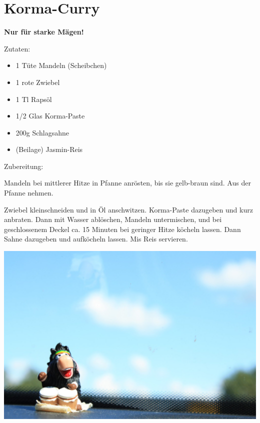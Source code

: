 \section{Korma-Curry}
\textbf{Nur für starke Mägen!}

Zutaten:
\begin{itemize}
    \item 1 Tüte Mandeln (Scheibchen)
    \item 1 rote Zwiebel
    \item 1 Tl Rapsöl
    \item 1/2 Glas Korma-Paste
    \item 200g Schlagsahne
    \item (Beilage) Jasmin-Reis
\end{itemize}

\noindent Zubereitung:

\noindent Mandeln bei mittlerer Hitze in Pfanne anrösten, bis sie gelb-braun
sind. Aus der Pfanne nehmen.

Zwiebel kleinschneiden und in Öl anschwitzen. Korma-Paste dazugeben und kurz
anbraten. Dann mit Wasser ablöschen, Mandeln untermischen, und bei
geschlossenem Deckel ca. 15 Minuten bei geringer Hitze köcheln lassen. Dann
Sahne dazugeben und aufköcheln lassen. Mis Reis servieren.

\newpage
\mbox{}
\vfill
\begin{center}
    \includegraphics[width=\textwidth]{Korma/IMG_3250._small.jpg}
\end{center}
\vfill
\mbox{ }
\newpage

